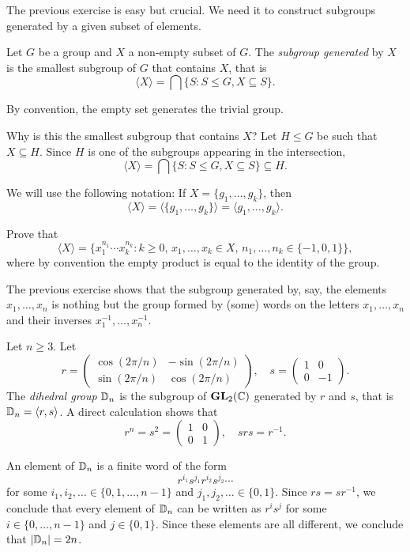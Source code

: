 
The previous exercise is easy but crucial. We need it 
to construct subgroups generated 
by a given subset of elements. 

\begin{definition}
        Let $G$ be a group and $X$ a non-empty 
        subset of $G$. The \emph{subgroup
        generated} by $X$ is the smallest subgroup of $G$ that contains
        $X$, that is 
        \[
            \langle X\rangle=\bigcap\{S:S\leq G,X\subseteq S\}.
        \]
\end{definition}

By convention, the empty set generates the trivial group. 

Why is this the smallest subgroup that contains $X$? 
Let $H\leq G$ be such that 
$X\subseteq H$. Since $H$ is one of the subgroups appearing
in the intersection, 
\[
        \langle X\rangle=\bigcap\{S:S\leq G,X\subseteq S\}\subseteq H.        
\]

We will use the following notation:
If $X=\{g_1,\dots,g_k\}$, then 
\[
\langle
X\rangle=\langle\{g_1,\dots,g_k\}\rangle=\langle g_1,\dots,g_k\rangle.
\]

\begin{exercise}
\label{xca:generated}
Prove that 
\[
    \langle X\rangle=\{x_1^{n_1}\cdots x_k^{n_k}:k\geq0,\,x_1,\dots,x_k\in X,\,n_1,\dots,n_k\in\{-1,0,1\}\},
\]
where by convention the empty product is equal to the identity of the group. 
\end{exercise}

The previous exercise shows that
the subgroup generated by, say, the elements 
$x_1,\dots,x_n$ is nothing but the 
group formed by (some) words on the letters 
$x_1,\dots,x_n$ and their inverses 
$x_1^{-1},\dots,x_n^{-1}$. 

\begin{example}
\label{exa:dihedral}
Let $n\geq3$. Let 
\[
r=\begin{pmatrix}
\cos(2\pi/n) & -\sin(2\pi/n)\\
\sin(2\pi/n) & \cos(2\pi/n)
\end{pmatrix},
\quad
s=\begin{pmatrix}
        1 & 0\\
        0 & -1
\end{pmatrix}.
\]
The \emph{dihedral group} $\mathbb{D}_n$ is the subgroup of
$\mathbf{GL}_2(\mathbb{C})$ generated by $r$ and $s$,
that is $\mathbb{D}_n=\langle r,s\rangle$. A direct calculation shows that 
\[
r^n=s^2=\begin{pmatrix}
        1&0\\
        0&1
\end{pmatrix},
\quad
srs=r^{-1}.
\]

An element of $\mathbb{D}_n$ is a finite word of the form 
\[
r^{i_1}s^{j_1}r^{i_2}s^{j_2}\cdots
\]
for some 
 $i_1,i_2,\dots\in\{0,1,\dots,n-1\}$ and 
$j_1,j_2,\dots\in\{0,1\}$. Since $rs=sr^{-1}$, we conclude that
every element of $\mathbb{D}_n$ can be written as $r^is^j$ 
for some $i\in\{0,\dots,n-1\}$ and $j\in\{0,1\}$. Since these elements are all different, we conclude that 
$|\mathbb{D}_n|=2n$.
\end{example}

